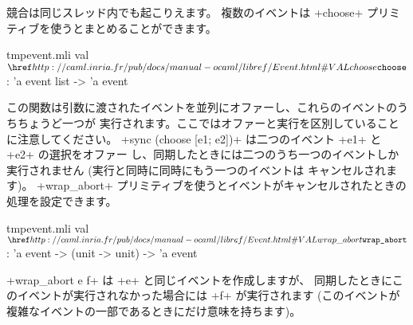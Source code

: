 競合は同じスレッド内でも起こりえます。
複数のイベントは \ml+choose+ プリミティブを使うとまとめることができます。
%
\begin{listingcodefile}{tmpevent.mli}
val $\indexlibvalue{Event}{choose}$ : 'a event list -> 'a event
\end{listingcodefile}
%
この関数は引数に渡されたイベントを並列にオファーし、これらのイベントのうちちょうど一つが
実行されます。ここではオファーと実行を区別していることに注意してください。
\ml+sync (choose [e1; e2])+ は二つのイベント \ml+e1+ と \ml+e2+ の選択をオファー
し、同期したときには二つのうち一つのイベントしか実行されません (実行と同時に同時にもう一つのイベントは
キャンセルされます)。
\ml+wrap_abort+ プリミティブを使うとイベントがキャンセルされたときの処理を設定できます。
%
\begin{listingcodefile}{tmpevent.mli}
val $\indexlibvalue{Event}{wrap\_abort}$ : 'a event -> (unit -> unit) -> 'a event
\end{listingcodefile}
%
\ml+wrap_abort e f+ は \ml+e+ と同じイベントを作成しますが、
同期したときにこのイベントが実行されなかった場合には \ml+f+ が実行されます
(このイベントが複雑なイベントの一部であるときにだけ意味を持ちます)。

